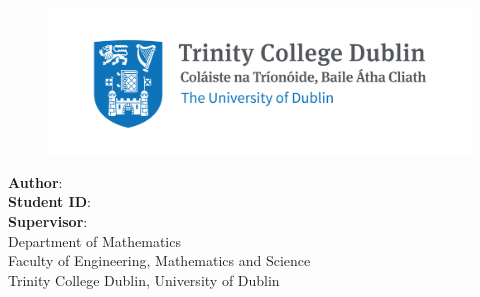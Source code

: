 \makeatletter
\begin{titlepage}
    \begin{center}
        \vspace*{1cm}

        \huge
        \textbf{\@title}

        \vspace{1cm}
        \LARGE
        \thesistype{}
        
		\vfill

        \begin{figure}[htbp]
             \centering
             \includegraphics[width=0.8\linewidth]{./Figures/logo2}
        \end{figure}
		
		\vfill

        \Large
        \textbf{Author}: \thesisauthor{} \\
        \textbf{Student ID}: \studentID{}\\
        \textbf{Supervisor}: \supervisor{}\\

        \vspace{1.5cm}
        Department of Mathematics\\
        Faculty of Engineering, Mathematics and Science\\
        Trinity College Dublin, University of Dublin\\

        \vspace{1cm}
        \@date

    \end{center}
\end{titlepage}
\makeatother